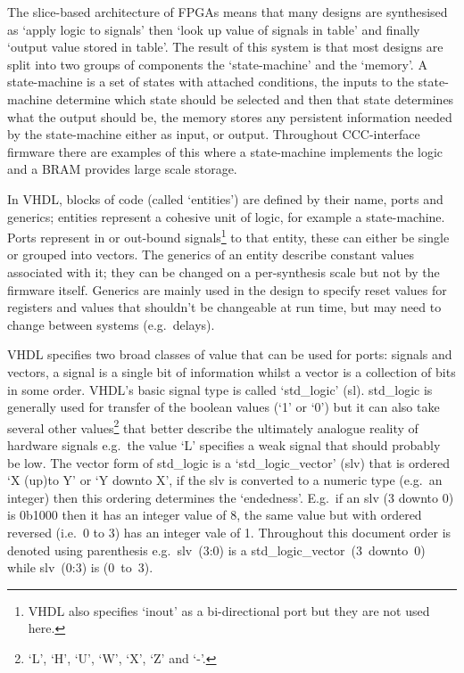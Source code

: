 The slice-based architecture of FPGAs means that many designs are synthesised as `apply logic to signals' then `look up value of signals in table' and finally `output value stored in table'. The result of this system is that most designs are split into two groups of components the `state-machine' and the `memory'. A state-machine is a set of states with attached conditions, the inputs to the state-machine determine which state should be selected and then that state determines what the output should be, the memory stores any persistent information needed by the state-machine either as input, or output. Throughout CCC-interface firmware there are examples of this where a state-machine implements the logic and a BRAM provides large scale storage.

In VHDL, blocks of code (called `entities') are defined by their name, ports and generics; entities represent a cohesive unit of logic, for example a state-machine. Ports represent in or out-bound signals\footnote{VHDL also specifies `inout' as a bi-directional port but they are not used here.} to that entity, these can either be single or grouped into vectors. The generics of an entity describe constant values associated with it; they can be changed on a per-synthesis scale but not by the firmware itself. Generics are mainly used in the design to specify reset values for registers and values that shouldn't be changeable at run time, but may need to change between systems (e.g.\ delays). 

VHDL specifies two broad classes of value that can be used for ports: signals and vectors, a signal is a single bit of information whilst a vector is a collection of bits in some order. VHDL's basic signal type is called `std\_logic' (sl). std\_logic is generally used for transfer of the boolean values (`1' or `0') but it can also take several other values\footnote{`L', `H', `U', `W', `X', `Z' and `-'.} that better describe the ultimately analogue reality of hardware signals e.g.\ the value `L' specifies a weak signal that should probably be low. The vector form of std\_logic is a `std\_logic\_vector' (slv) that is ordered `X (up)to Y' or `Y downto X', if the slv is converted to a numeric type (e.g.\ an integer) then this ordering determines the `endedness'. E.g.\ if an slv (3 downto 0) is 0b1000 then it has an integer value of 8, the same value but with ordered reversed (i.e.\ 0 to 3) has an integer vale of 1. Throughout this document order is denoted using parenthesis e.g.\ slv~(3:0) is a std\_logic\_vector~(3~downto~0) while slv~(0:3) is (0~to~3).

